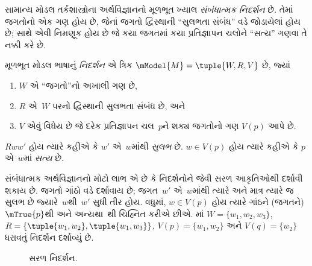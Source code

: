 
\label{guunit:OLP-0412}


સામાન્ય મોડલ તર્કશાસ્ત્રોના અર્થવિજ્ઞાનનો મૂળભૂત ખ્યાલ
\emph{સંબંધાત્મક નિદર્શન} છે. તેમાં જગતોનો એક ગણ હોય છે,
જેનાં જગતો દ્વિસ્થાની ``સુલભતા સંબંધ'' વડે જોડાયેલાં હોય છે;
સાથે એવી નિમણૂક હોય છે જે કયા જગતમાં કયા
પ્રતિજ્ઞાપન ચલોને ``સત્ય'' ગણવા તે નક્કી કરે છે.

\begin{defn}
  મૂળભૂત મોડલ ભાષાનું \emph{નિદર્શન} એ ત્રિક
  $\mModel{M} = \tuple{W, R, V}$ છે, જ્યાં
  \begin{enumerate}
  \item $W$ એ ``જગતો''નો અખાલી ગણ છે,
  \item $R$ એ~$W$ પરનો દ્વિસ્થાની સુલભતા સંબંધ છે, અને
  \item $V$ એવું વિધેય છે જે દરેક પ્રતિજ્ઞાપન ચલ~$p$ને શક્ય જગતોનો ગણ $V(p)$ આપે છે.
  \end{enumerate}
  $Rww'$ હોય ત્યારે કહીએ કે $w'$ એ~$w$માંથી \emph{સુલભ}
  છે. $w \in V(p)$ હોય ત્યારે કહીએ કે $p$ એ~$w$માં
  \emph{સત્ય} છે.
\end{defn}

સંબંધાત્મક અર્થવિજ્ઞાનનો મોટો લાભ એ છે કે નિદર્શનોને
 જેવી સરળ આકૃતિઓથી દર્શાવી શકાય છે.
જગતો ગાંઠો વડે દર્શાવાય છે; જગત~$w'$ એ~$w$માંથી
ત્યારે અને માત્ર ત્યારે જ સુલભ છે જ્યારે~$w$થી~$w'$
સુધી તીર હોય. વધુમાં, $w \in V(p)$ હોય ત્યારે ગાંઠને
(જગતને)~$\mTrue{p}$થી અને અન્યથા~થી
ચિહ્નિત કરીએ છીએ. માં
$W = \{w_1, w_2, w_3\}$, $R = \{\tuple{w_1, w_2},\tuple{w_1,
  w_3}\}$, $V(p) = \{w_1, w_2\}$ અને $V(q) = \{w_2\}$
ધરાવતું નિદર્શન દર્શાવ્યું છે.

\begin{figure}
  \begin{center}
  \end{center}
  \caption{સરળ નિદર્શન.}
\end{figure}
\endgroup


